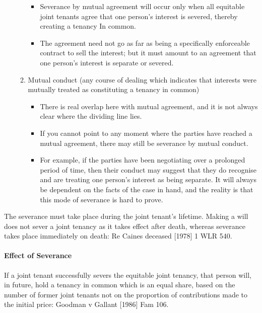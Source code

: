 \documentclass[
]{article}
\providecommand{\tightlist}{%
  \setlength{\itemsep}{0pt}\setlength{\parskip}{0pt}}
\begin{document}
\begin{enumerate}
\begin{enumerate}
    \begin{itemize}
    \tightlist
    \item
      Severance by mutual agreement will occur only when all equitable
      joint tenants agree that one person's interest is severed, thereby
      creating a tenancy In common.
    \item
      The agreement need not go as far as being a specifically
      enforceable contract to sell the interest; but it must amount to
      an agreement that one person's interest is separate or severed.
    \end{itemize}
  \item
    Mutual conduct (any course of dealing which indicates that interests
    were mutually treated as constituting a tenancy in common)

    \begin{itemize}
    \tightlist
    \item
      There is real overlap here with mutual agreement, and it is not
      always clear where the dividing line lies.
    \item
      If you cannot point to any moment where the parties have reached a
      mutual agreement, there may still be severance by mutual conduct.
    \item
      For example, if the parties have been negotiating over a prolonged
      period of time, then their conduct may suggest that they do
      recognise and are treating one person's interest as being
      separate. It will always be dependent on the facts of the case in
      hand, and the reality is that this mode of severance is hard to
      prove.
    \end{itemize}
  \end{enumerate}
\end{enumerate}

The severance must take place during the joint tenant's lifetime. Making
a will does not sever a joint tenancy as it takes effect after death,
whereas severance takes place immediately on death: Re Caines deceased
{[}1978{]} 1 WLR 540.

\hypertarget{effect-of-severance}{%
\paragraph{Effect of Severance}\label{effect-of-severance}}

If a joint tenant successfully severs the equitable joint tenancy, that
person will, in future, hold a tenancy in common which is an equal
share, based on the number of former joint tenants not on the proportion
of contributions made to the initial price: Goodman v Gallant {[}1986{]}
Fam 106.
\end{document}
